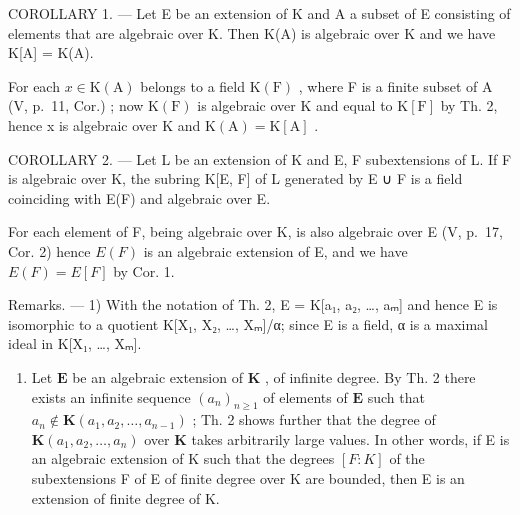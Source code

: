 COROLLARY 1. --- Let E be an extension of K and A a subset of E consisting of elements that are algebraic over K. Then K(A) is algebraic over K and we have K{[}A{]} = K(A).

For each \(x \in \mathrm{K}(\mathrm{A})\) belongs to a field \(\mathrm{K}(\mathrm{F})\) , where F is a finite subset of A (V, p.~11, Cor.) ; now \(\mathrm{K}(\mathrm{F})\) is algebraic over K and equal to \(\mathrm{K}[\mathrm{F}]\) by Th. 2, hence x is algebraic over K and \(\mathrm{K}(\mathrm{A}) = \mathrm{K}[\mathrm{A}]\) .

COROLLARY 2. --- Let L be an extension of K and E, F subextensions of L. If F is algebraic over K, the subring K{[}E, F{]} of L generated by E ∪ F is a field coinciding with E(F) and algebraic over E.

For each element of F, being algebraic over K, is also algebraic over E (V, p.~17, Cor. 2) hence \(E(F)\) is an algebraic extension of E, and we have \(E(F) = E[F]\) by Cor. 1.

Remarks. --- 1) With the notation of Th. 2, E = K{[}a₁, a₂, \ldots, aₘ{]} and hence E is isomorphic to a quotient K{[}X₁, X₂, \ldots, Xₘ{]}/α; since E is a field, α is a maximal ideal in K{[}X₁, \ldots, Xₘ{]}.

\begin{enumerate}
\def\labelenumi{\arabic{enumi})}
\setcounter{enumi}{1}
\tightlist
\item
  Let \(\mathbf{E}\) be an algebraic extension of \(\mathbf{K}\) , of infinite degree. By Th. 2 there exists an infinite sequence \((a_n)_{n \geq 1}\) of elements of \(\mathbf{E}\) such that \(a_n \notin \mathbf{K}(a_1, a_2, \ldots, a_{n-1})\) ; Th. 2 shows further that the degree of \(\mathbf{K}(a_1, a_2, \ldots, a_n)\) over \(\mathbf{K}\) takes arbitrarily large values. In other words, if E is an algebraic extension of K such that the degrees \([F:K]\) of the subextensions F of E of finite degree over K are bounded, then E is an extension of finite degree of K.
\end{enumerate}

